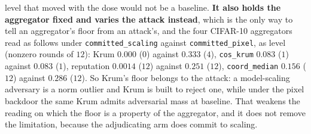 \documentclass{article}
\begin{document}
level that moved with the dose would not be a baseline. \textbf{It also holds the aggregator fixed and varies the attack instead}, which is the only way to tell an aggregator's floor from an attack's, and the four CIFAR-10 aggregators read as follows under \texttt{committed\_\allowbreak scaling} against \texttt{committed\_\allowbreak pixel}, as level (nonzero rounds of $12$): Krum $0.000$ ($0$) against $0.333$ ($4$), \texttt{cos\_krum} $0.083$ ($1$) against $0.083$ ($1$), reputation $0.0014$ ($12$) against $0.251$ ($12$), \texttt{coord\_median} $0.156$ ($12$) against $0.286$ ($12$). So Krum's floor belongs to the attack: a model-scaling adversary is a norm outlier and Krum is built to reject one, while under the pixel backdoor the same Krum admits adversarial mass at baseline. That weakens the reading on which the floor is a property of the aggregator, and it does not remove the limitation, because the adjudicating arm does commit to scaling.
\end{document}
